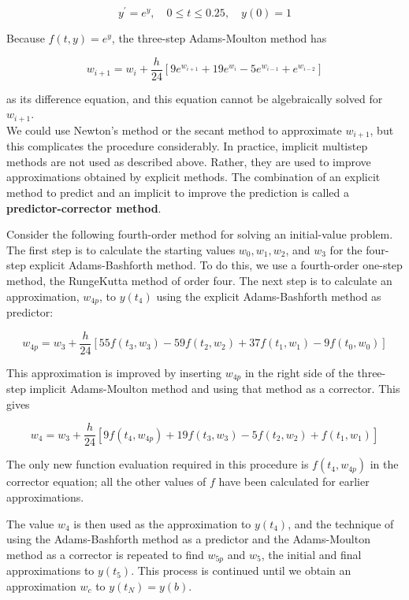 $$
y^{\prime}=e^{y}, \quad 0 \leq t \leq 0.25, \quad y(0)=1
$$

Because $f(t, y)=e^{y}$, the three-step Adams-Moulton method has

$$
w_{i+1}=w_{i}+\frac{h}{24}\left[9 e^{w_{i+1}}+19 e^{w_{i}}-5 e^{w_{i-1}}+e^{w_{i-2}}\right]
$$

as its difference equation, and this equation cannot be algebraically solved for $w_{i+1}$.\\
We could use Newton's method or the secant method to approximate $w_{i+1}$, but this complicates the procedure considerably. In practice, implicit multistep methods are not used as described above. Rather, they are used to improve approximations obtained by explicit methods. The combination of an explicit method to predict and an implicit to improve the prediction is called a {\bf predictor-corrector method}.

Consider the following fourth-order method for solving an initial-value problem. The first step is to calculate the starting values $w_{0}, w_{1}, w_{2}$, and $w_{3}$ for the four-step explicit Adams-Bashforth method. To do this, we use a fourth-order one-step method, the RungeKutta method of order four. The next step is to calculate an approximation, $w_{4 p}$, to $y\left(t_{4}\right)$ using the explicit Adams-Bashforth method as predictor:

$$
w_{4 p}=w_{3}+\frac{h}{24}\left[55 f\left(t_{3}, w_{3}\right)-59 f\left(t_{2}, w_{2}\right)+37 f\left(t_{1}, w_{1}\right)-9 f\left(t_{0}, w_{0}\right)\right]
$$

This approximation is improved by inserting $w_{4 p}$ in the right side of the three-step implicit Adams-Moulton method and using that method as a corrector. This gives

$$
w_{4}=w_{3}+\frac{h}{24}\left[9 f\left(t_{4}, w_{4 p}\right)+19 f\left(t_{3}, w_{3}\right)-5 f\left(t_{2}, w_{2}\right)+f\left(t_{1}, w_{1}\right)\right]
$$

The only new function evaluation required in this procedure is $f\left(t_{4}, w_{4 p}\right)$ in the corrector equation; all the other values of $f$ have been calculated for earlier approximations.

The value $w_{4}$ is then used as the approximation to $y\left(t_{4}\right)$, and the technique of using the Adams-Bashforth method as a predictor and the Adams-Moulton method as a corrector is repeated to find $w_{5 p}$ and $w_{5}$, the initial and final approximations to $y\left(t_{5}\right)$. This process is continued until we obtain an approximation $w_{c}$ to $y\left(t_{N}\right)=y(b)$.

